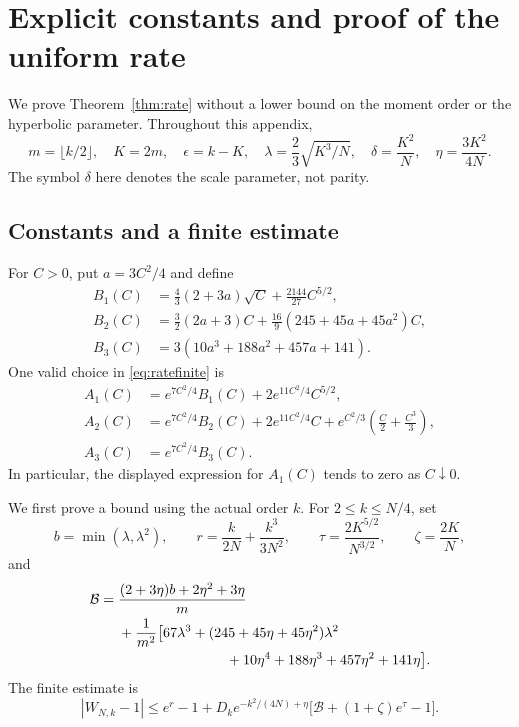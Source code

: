 \section{Explicit constants and proof of the uniform rate}\label{sec:rateproof}

We prove Theorem~\ref{thm:rate} without a lower bound on the moment order or the hyperbolic parameter. Throughout this appendix,
\[
m=\lfloor k/2\rfloor,\quad K=2m,\quad\epsilon=k-K,\quad
\lambda=\frac23\sqrt{K^3/N},\quad
\delta=\frac{K^2}{N},\quad\eta=\frac{3K^2}{4N}.
\]
The symbol $\delta$ here denotes the scale parameter, not parity.

\subsection{Constants and a finite estimate}

For $C>0$, put $a=3C^2/4$ and define
\begin{equation}\label{eq:rateconstantsB}
\begin{aligned}
B_1(C)&=\frac43(2+3a)\sqrt C+\frac{2144}{27}C^{5/2},\\
B_2(C)&=\frac32(2a+3)C
+\frac{16}{9}(245+45a+45a^2)C,\\
B_3(C)&=3(10a^3+188a^2+457a+141).
\end{aligned}
\end{equation}
One valid choice in \eqref{eq:ratefinite} is
\begin{equation}\label{eq:rateconstantsA}
\begin{aligned}
A_1(C)&=e^{7C^2/4}B_1(C)+2e^{11C^2/4}C^{5/2},\\
A_2(C)&=e^{7C^2/4}B_2(C)+2e^{11C^2/4}C
+e^{C^2/3}\left(\frac C2+\frac{C^3}{3}\right),\\
A_3(C)&=e^{7C^2/4}B_3(C).
\end{aligned}
\end{equation}
In particular, the displayed expression for $A_1(C)$ tends to zero as $C\downarrow0$.

We first prove a bound using the actual order $k$. For $2\le k\le N/4$, set
\[
b=\min(\lambda,\lambda^2),\qquad
r=\frac{k}{2N}+\frac{k^3}{3N^2},\qquad
\tau=\frac{2K^{5/2}}{N^{3/2}},\qquad\zeta=\frac{2K}{N},
\]
and
\begin{equation}\label{eq:rateB}
\begin{aligned}
\mathcal B={}&\frac{(2+3\eta)b+2\eta^2+3\eta}{m}\\
&+\frac{1}{m^2}\bigl[67\lambda^3+(245+45\eta+45\eta^2)\lambda^2\\
&\hspace{27mm}+10\eta^4+188\eta^3+457\eta^2+141\eta\bigr].
\end{aligned}
\end{equation}
The finite estimate is
\begin{equation}\label{eq:ratelocal}
|W_{N,k}-1|
\le e^r-1+D_ke^{-k^2/(4N)+\eta}
\bigl[\mathcal B+(1+\zeta)e^\tau-1\bigr].
\end{equation}

